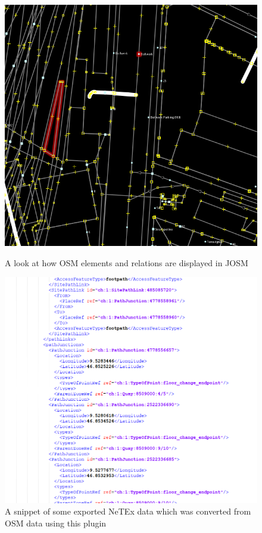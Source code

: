 \begin{figure}[!htb]
	\centering
	\begin{minipage}[b]{0.48\textwidth}
		\includegraphics[width=\textwidth]{./Images/ArchitectureDesign/highlight_example.png}
		\caption{A look at how OSM elements and relations are displayed in JOSM}
	\end{minipage}
	\hfill
	\begin{minipage}[b]{0.48\textwidth}
		\includegraphics[width=\textwidth]{./Images/ManagementSummary/netex_doc_example.png}
		\caption{A snippet of some exported NeTEx data which was converted from OSM data using this plugin}
	\end{minipage}
\end{figure}
\newpage
